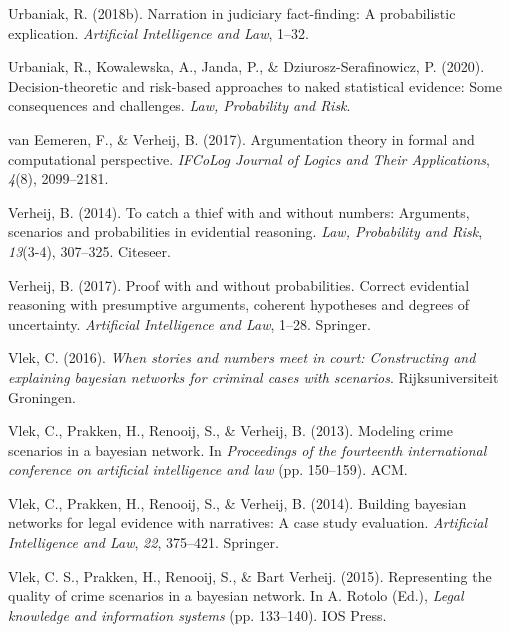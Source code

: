 \documentclass[11pt,dvipsnames,enabledeprecatedfontcommands]{scrartcl}
\begin{document}
\leavevmode\hypertarget{ref-Urbaniak2017Narration-in-ju}{}%
Urbaniak, R. (2018b). Narration in judiciary fact-finding: A
probabilistic explication. \emph{Artificial Intelligence and Law},
1--32.

\leavevmode\hypertarget{ref-Urbaniak2020Decision}{}%
Urbaniak, R., Kowalewska, A., Janda, P., \& Dziurosz-Serafinowicz, P.
(2020). Decision-theoretic and risk-based approaches to naked
statistical evidence: Some consequences and challenges. \emph{Law,
Probability and Risk}.

\leavevmode\hypertarget{ref-vanEemeren2017}{}%
van Eemeren, F., \& Verheij, B. (2017). Argumentation theory in formal
and computational perspective. \emph{IFCoLog Journal of Logics and Their
Applications}, \emph{4}(8), 2099--2181.

\leavevmode\hypertarget{ref-verheij2014catch}{}%
Verheij, B. (2014). To catch a thief with and without numbers:
Arguments, scenarios and probabilities in evidential reasoning.
\emph{Law, Probability and Risk}, \emph{13}(3-4), 307--325. Citeseer.

\leavevmode\hypertarget{ref-verheijproof2017}{}%
Verheij, B. (2017). Proof with and without probabilities. Correct
evidential reasoning with presumptive arguments, coherent hypotheses and
degrees of uncertainty. \emph{Artificial Intelligence and Law}, 1--28.
Springer.

\leavevmode\hypertarget{ref-vlek2016stories}{}%
Vlek, C. (2016). \emph{When stories and numbers meet in court:
Constructing and explaining bayesian networks for criminal cases with
scenarios}. Rijksuniversiteit Groningen.

\leavevmode\hypertarget{ref-vlek2013modeling}{}%
Vlek, C., Prakken, H., Renooij, S., \& Verheij, B. (2013). Modeling
crime scenarios in a bayesian network. In \emph{Proceedings of the
fourteenth international conference on artificial intelligence and law}
(pp. 150--159). ACM.

\leavevmode\hypertarget{ref-vlek2014building}{}%
Vlek, C., Prakken, H., Renooij, S., \& Verheij, B. (2014). Building
bayesian networks for legal evidence with narratives: A case study
evaluation. \emph{Artificial Intelligence and Law}, \emph{22}, 375--421.
Springer.

\leavevmode\hypertarget{ref-vlek2015}{}%
Vlek, C. S., Prakken, H., Renooij, S., \& Bart Verheij. (2015).
Representing the quality of crime scenarios in a bayesian network. In A.
Rotolo (Ed.), \emph{Legal knowledge and information systems} (pp.
133--140). IOS Press.
\end{document}
